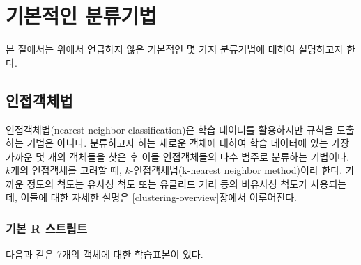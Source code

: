 \documentclass[]{book}
\begin{document}
\hypertarget{simple-classification-methods}{%
\section{기본적인 분류기법}\label{simple-classification-methods}}

본 절에서는 위에서 언급하지 않은 기본적인 몇 가지 분류기법에 대하여 설명하고자 한다.

\hypertarget{nearest-neighbor-classification}{%
\subsection{인접객체법}\label{nearest-neighbor-classification}}

인접객체법(nearest neighbor classification)은 학습 데이터를 활용하지만 규칙을 도출하는 기법은 아니다. 분류하고자 하는 새로운 객체에 대하여 학습 데이터에 있는 가장 가까운 몇 개의 객체들을 찾은 후 이들 인접객체들의 다수 범주로 분류하는 기법이다. \(k\)개의 인접객체를 고려할 때, \(k\)-인접객체법(k-nearest neighbor method)이라 한다. 가까운 정도의 척도는 유사성 척도 또는 유클리드 거리 등의 비유사성 척도가 사용되는데, 이들에 대한 자세한 설명은 \ref{clustering-overview}장에서 이루어진다.

\hypertarget{nearest-neighbor-classificaiton-basic-script}{%
\subsubsection{기본 R 스트립트}\label{nearest-neighbor-classificaiton-basic-script}}

다음과 같은 7개의 객체에 대한 학습표본이 있다.
\end{document}
